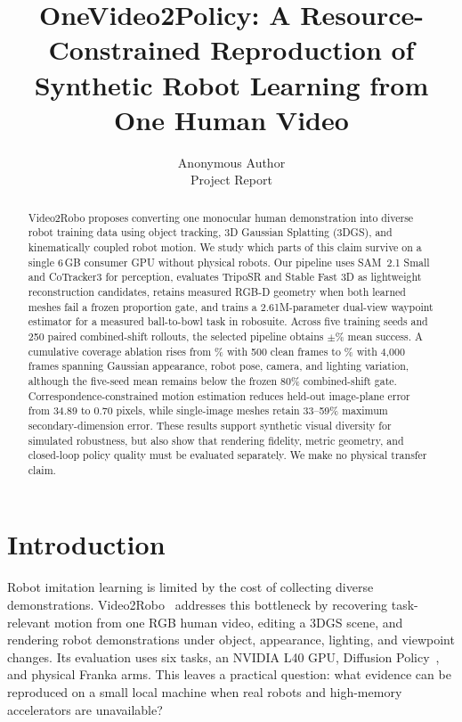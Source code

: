 \documentclass[10pt,twocolumn,letterpaper]{article}
\title{OneVideo2Policy: A Resource-Constrained Reproduction of\\
Synthetic Robot Learning from One Human Video}
\author{Anonymous Author\\Project Report}
\begin{document}
\maketitle

\begin{abstract}
Video2Robo proposes converting one monocular human demonstration into diverse
robot training data using object tracking, 3D Gaussian Splatting (3DGS), and
kinematically coupled robot motion. We study which parts of this claim survive on
a single 6\,GB consumer GPU without physical robots. Our pipeline uses SAM~2.1
Small and CoTracker3 for perception, evaluates TripoSR and Stable Fast 3D as
lightweight reconstruction candidates, retains measured RGB-D geometry when both
learned meshes fail a frozen proportion gate, and trains a 2.61M-parameter
dual-view waypoint estimator for a measured ball-to-bowl task in robosuite.
Across five training seeds and 250 paired combined-shift rollouts, the selected
pipeline obtains \SeedMean$\pm$\SeedStd\% mean success. A cumulative coverage
ablation rises from \CoverageCleanFiveHundred\% with 500 clean frames to
\CoveragePlusCombinedFourThousand\% with 4,000 frames spanning Gaussian appearance,
robot pose, camera, and lighting variation, although the five-seed mean remains
below the frozen 80\% combined-shift gate. Correspondence-constrained motion
estimation reduces held-out image-plane error from 34.89 to 0.70 pixels, while
single-image meshes retain 33--59\% maximum secondary-dimension error. These
results support synthetic visual diversity for simulated robustness, but also
show that rendering fidelity, metric geometry, and closed-loop policy quality
must be evaluated separately. We make no physical transfer claim.
\end{abstract}

\section{Introduction}
Robot imitation learning is limited by the cost of collecting diverse
demonstrations. Video2Robo~\cite{deng2026video2robo} addresses this bottleneck by
recovering task-relevant motion from one RGB human video, editing a 3DGS scene,
and rendering robot demonstrations under object, appearance, lighting, and
viewpoint changes. Its evaluation uses six tasks, an NVIDIA L40 GPU, Diffusion
Policy~\cite{chi2023diffusion}, and physical Franka arms. This leaves a practical
question: what evidence can be reproduced on a small local machine when real
robots and high-memory accelerators are unavailable?
\end{document}
